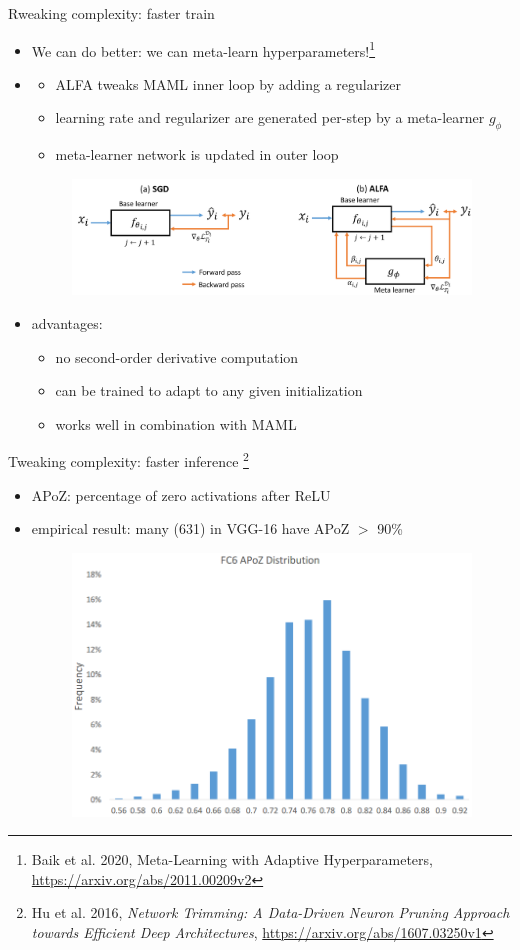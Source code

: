 \documentclass[aspectratio=1610]{beamer}
\renewcommand{\bold}[1]{\textbf{\structure{#1}}}
\begin{document}
\begin{frame}{Rweaking complexity: faster train}
    \begin{itemize}
        \item We can do better: we can meta-learn hyperparameters!\footnote{Baik et al. 2020, Meta-Learning with Adaptive Hyperparameters, \url{https://arxiv.org/abs/2011.00209v2}}
        \item \begin{itemize}
            \item ALFA tweaks MAML inner loop by adding a regularizer
            \item learning rate and regularizer are generated per-step by a meta-learner \(g_\phi\)
            \item meta-learner network is updated in outer loop
        \end{itemize}
        \bigskip
        \begin{figure}
            \centering
            \includegraphics[width=.65\textwidth]{alfa.png}
        \end{figure}
        \pause
        \item advantages:
        \begin{itemize}
            \item no second-order derivative computation
            \item can be trained to adapt to any given initialization
            \item works well in combination with MAML
        \end{itemize}
    \end{itemize}
\end{frame}

\begin{frame}{Tweaking complexity: faster inference}
    \bold{Network trimming}\footnote{Hu et al. 2016, \emph{Network Trimming: A Data-Driven Neuron Pruning Approach towards Efficient Deep Architectures},  \url{https://arxiv.org/abs/1607.03250v1}}
    \begin{itemize}
        \item APoZ: percentage of zero activations after ReLU
        \pause
        \item empirical result: many (631) in VGG-16 have APoZ \(>\) 90\%
        \bigskip
        \begin{figure}
            \includegraphics[width=.4\textwidth]{apoz.png}
        \end{figure}
    \end{itemize}
\end{frame}
\end{document}
